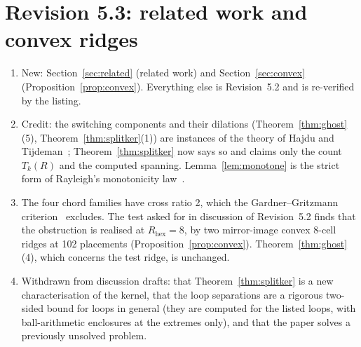 \documentclass[11pt,a4paper]{article}
\theoremstyle{definition}
\theoremstyle{remark}
\begin{document}
\section*{Revision 5.3: related work and convex ridges}
\begin{enumerate}[noitemsep,leftmargin=*]
\item New: Section~\ref{sec:related} (related work) and Section~\ref{sec:convex} (Proposition~\ref{prop:convex}). Everything else is Revision~5.2 and is re-verified by the listing.
\item Credit: the switching components and their dilations (Theorem~\ref{thm:ghost}(5), Theorem~\ref{thm:splitker}(1)) are instances of the theory of Hajdu and Tijdeman~\cite{hajdu2001,hajdu2001laa}; Theorem~\ref{thm:splitker} now says so and claims only the count $T_k(R)$ and the computed spanning. Lemma~\ref{lem:monotone} is the strict form of Rayleigh's monotonicity law~\cite{doyle1984}.
\item The four chord families have cross ratio 2, which the Gardner--Gritzmann criterion~\cite{gardner1997} excludes. The test asked for in discussion of Revision~5.2 finds that the obstruction is realised at $R_{\text{hex}} = 8$, by two mirror-image convex 8-cell ridges at 102 placements (Proposition~\ref{prop:convex}). Theorem~\ref{thm:ghost}(4), which concerns the test ridge, is unchanged.
\item Withdrawn from discussion drafts: that Theorem~\ref{thm:splitker} is a new characterisation of the kernel, that the loop separations are a rigorous two-sided bound for loops in general (they are computed for the listed loops, with ball-arithmetic enclosures at the extremes only), and that the paper solves a previously unsolved problem.
\end{enumerate}
\end{document}
